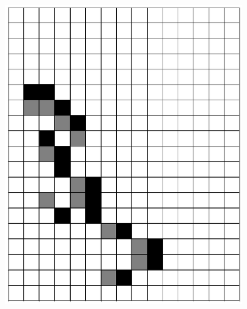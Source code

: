 \documentclass[12pt]{article}
\numberwithin{figure}{section} %
\begin{document}
\begin{figure}[H]
\begin{subfigure}{0.3\textwidth}
     		\subcaption{}
   	\end{subfigure}
     	\begin{subfigure}{0.3\textwidth}
     		\centering
     		\includegraphics[width=\linewidth]{Section4/29.4}
     		\subcaption{}
   	\end{subfigure}
    	\begin{subfigure}{0.3\textwidth}
     		\centering

\end{subfigure}
\end{figure}
\end{document}
